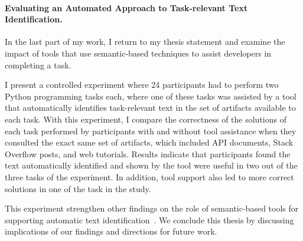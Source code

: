 \paragraph{\textbf{Evaluating an Automated Approach to Task-relevant Text Identification.}} 




In the last part of my work, I return to my thesis statement
and examine the impact of tools that use semantic-based techniques to assist developers in 
completing a task. 



I present a controlled experiment where 24 participants had to 
perform two Python programming tasks each, where one of these tasks 
was assisted by a tool that automatically identifies task-relevant text 
in the set of artifacts available to each task. 
With this experiment, I compare the correctness of the solutions of each task 
performed by participants with and without tool assistance 
when they consulted the exact same set of artifacts, which included 
API documents, Stack Overflow posts, and web tutorials. 
Results indicate that participants found the text automatically identified
and shown by the tool were useful in two out of the three tasks of the experiment.
In addition, tool support also led to more correct solutions 
in one of the task in the study.





This experiment strengthen other findings on the 
role of semantic-based tools for supporting
automatic text identification~\cite{nadi2020, Xu2017,Lotufo2012}.
We conclude this thesis by discussing implications of our findings and 
directions for future work.





